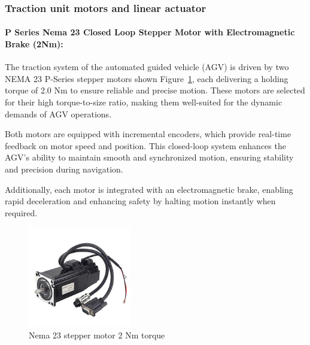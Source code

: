 \documentclass[../../main]{subfiles}
\begin{document}
\subsubsection{Traction unit motors and linear actuator}


    
\paragraph{P Series Nema 23 Closed Loop Stepper Motor with Electromagnetic
    Brake (2Nm):}
    
    The traction system of the automated guided vehicle (AGV)  
    is driven by two NEMA 23 P-Series stepper motors shown Figure~\ref{Nema 23 stepper motor},  
    each delivering a holding torque of 2.0 Nm to ensure  
    reliable and precise motion. These motors are selected  
    for their high torque-to-size ratio, making them well-suited  
    for the dynamic demands of AGV operations.  
    
    Both motors are equipped with incremental encoders, which provide real-time feedback  
    on motor speed and position. This closed-loop system  
    enhances the AGV's ability to maintain smooth and synchronized  
    motion, ensuring stability and precision during navigation.  
    
    Additionally, each motor is integrated with an electromagnetic  
    brake, enabling rapid deceleration and enhancing safety  
    by halting motion instantly when required. 

\begin{figure}[H]
\centering
\includegraphics[width=0.4\textwidth]{fig/nema_motor.png}
\caption{Nema 23 stepper motor 2 Nm torque }
\label{Nema 23 stepper motor} %
\end{figure}
\end{document}
